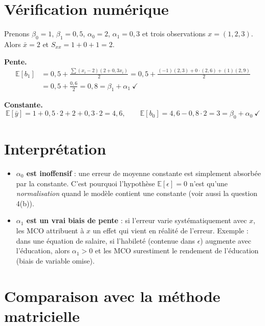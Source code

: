 \documentclass[11pt,a4paper]{article}
\newcommand{\E}{\mathbb{E}}
\newcommand{\Sxx}{S_{xx}}
\begin{document}
\section{Vérification numérique}

Prenons $\beta_0=1$, $\beta_1=0{,}5$, $\alpha_0=2$, $\alpha_1=0{,}3$ et trois observations $x=(1,2,3)$. Alors $\bar x=2$ et $\Sxx=1+0+1=2$.

\textbf{Pente.}
\begin{align*}
\E[b_1]&=0{,}5+\frac{\sum(x_i-2)(2+0{,}3x_i)}{2}
=0{,}5+\frac{(-1)(2{,}3)+0\cdot(2{,}6)+(1)(2{,}9)}{2}\\
&=0{,}5+\frac{0{,}6}{2}=0{,}8=\beta_1+\alpha_1\ \checkmark
\end{align*}

\textbf{Constante.}
\[
\E[\bar y]=1+0{,}5\cdot2+2+0{,}3\cdot2=4{,}6,
\qquad
\E[b_0]=4{,}6-0{,}8\cdot2=3=\beta_0+\alpha_0\ \checkmark
\]

\section{Interprétation}

\begin{cle}[title={Intuition}]
\begin{itemize}
\item \textbf{$\alpha_0$ est inoffensif} : une erreur de moyenne constante est simplement absorbée par la constante. C'est pourquoi l'hypothèse $\E[\epsilon]=0$ n'est qu'une \emph{normalisation} quand le modèle contient une constante (voir aussi la question 4(b)).
\item \textbf{$\alpha_1$ est un vrai biais de pente} : si l'erreur varie systématiquement avec $x$, les MCO attribuent à $x$ un effet qui vient en réalité de l'erreur. Exemple : dans une équation de salaire, si l'habileté (contenue dans $\epsilon$) augmente avec l'éducation, alors $\alpha_1>0$ et les MCO surestiment le rendement de l'éducation (biais de variable omise).
\end{itemize}
\end{cle}

\section{Comparaison avec la méthode matricielle}
\end{document}
